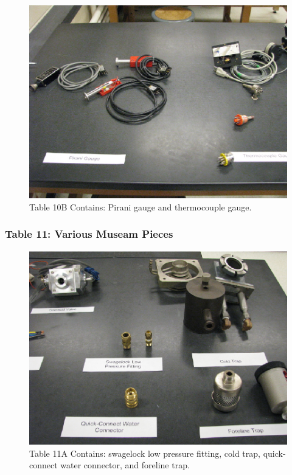 \documentclass{book}
\begin{document}
\begin{figure}[H]
\includegraphics[scale=0.9]{Museum-Pieces-Table10B}
\caption[align=left]{Table 10B Contains: Pirani gauge and thermocouple gauge.}
\end{figure}

\subsubsection{Table 11: Various Museam Pieces}

\begin{figure}[H]
\includegraphics[scale=0.9]{Museum-Pieces-Table11A}
\caption[align=left]{Table 11A Contains: swagelock low pressure fitting, cold trap, quick-connect water connector, and foreline trap.}
\end{figure}
\end{document}
